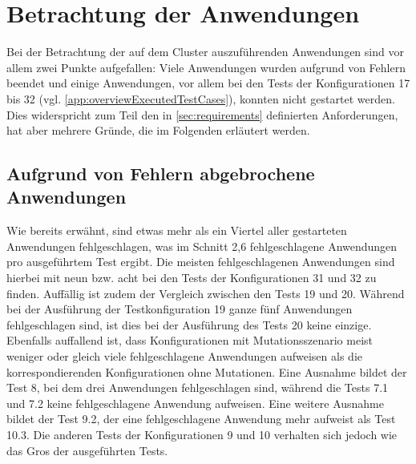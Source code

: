 \section{Betrachtung der Anwendungen}
\label{sec:appEval}

Bei der Betrachtung der auf dem Cluster auszuführenden Anwendungen sind vor allem zwei Punkte aufgefallen:
Viele Anwendungen wurden aufgrund von Fehlern beendet und einige Anwendungen, vor allem bei den Tests der Konfigurationen 17 bis 32 (vgl. \cref{app:overviewExecutedTestCases}), konnten nicht gestartet werden.
Dies widerspricht zum Teil den in \cref{sec:requirements} definierten Anforderungen, hat aber mehrere Gründe, die im Folgenden erläutert werden.

\subsection{Aufgrund von Fehlern abgebrochene Anwendungen}
\label{subsec:failedApps}

Wie bereits erwähnt, sind etwas mehr als ein Viertel aller gestarteten Anwendungen fehlgeschlagen, was im Schnitt 2,6 fehlgeschlagene Anwendungen pro ausgeführtem Test ergibt.
Die meisten fehlgeschlagenen Anwendungen sind hierbei mit neun bzw. acht bei den Tests der Konfigurationen 31 und 32 zu finden.
Auffällig ist zudem der Vergleich zwischen den Tests 19 und 20.
Während bei der Ausführung der Testkonfiguration 19 ganze fünf Anwendungen fehlgeschlagen sind, ist dies bei der Ausführung des Tests 20 keine einzige.
Ebenfalls auffallend ist, dass Konfigurationen mit Mutationsszenario meist weniger oder gleich viele fehlgeschlagene Anwendungen aufweisen als die korrespondierenden Konfigurationen ohne Mutationen.
Eine Ausnahme bildet der Test 8, bei dem drei Anwendungen fehlgeschlagen sind, während die Tests 7.1 und 7.2 keine fehlgeschlagene Anwendung aufweisen.
Eine weitere Ausnahme bildet der Test 9.2, der eine fehlgeschlagene Anwendung mehr aufweist als Test 10.3. Die anderen Tests der Konfigurationen 9 und 10 verhalten sich jedoch wie das Gros der ausgeführten Tests.

